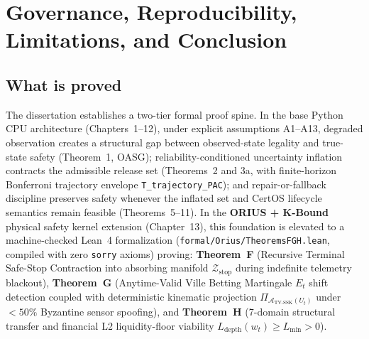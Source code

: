\chapter[Governance, Reproducibility, and Conclusion]{Governance, Reproducibility, Limitations, and Conclusion}
\label{ch:governance-reproducibility-limitations-conclusion}

\section{What is proved}
The dissertation establishes a two-tier formal proof spine. In the base Python CPU architecture
(Chapters~1--12), under explicit assumptions A1--A13, degraded observation creates a structural
gap between observed-state legality and true-state safety (Theorem~1, OASG); reliability-conditioned
uncertainty inflation contracts the admissible release set (Theorems~2 and 3a, with finite-horizon
Bonferroni trajectory envelope \texttt{T\_trajectory\_PAC}); and repair-or-fallback discipline
preserves safety whenever the inflated set and CertOS lifecycle semantics remain feasible
(Theorems~5--11). In the \textbf{ORIUS + K-Bound} physical safety kernel extension (Chapter~13),
this foundation is elevated to a machine-checked Lean~4 formalization (\texttt{formal/Orius/TheoremsFGH.lean},
compiled with zero \texttt{sorry} axioms) proving: \textbf{Theorem~F} (Recursive Terminal Safe-Stop
Contraction into absorbing manifold $\mathcal{Z}_{\text{stop}}$ during indefinite telemetry blackout),
\textbf{Theorem~G} (Anytime-Valid Ville Betting Martingale $E_t$ shift detection coupled with
deterministic kinematic projection $\Pi_{\mathcal{A}_{\text{TV-SSK}}(U_t)}$ under $<50\%$ Byzantine
sensor spoofing), and \textbf{Theorem~H} (7-domain structural transfer and financial L2 liquidity-floor
viability $L_{\text{depth}}(w_t)\ge L_{\min}>0$).

